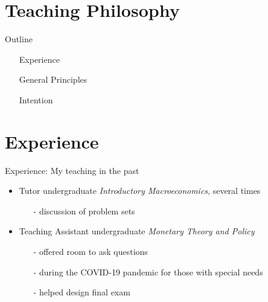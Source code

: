 

\section*{Teaching Philosophy}

\begin{frame}{Outline}
	\vspace{-15mm}\hspace{-10mm}
	\begin{minipage}{1\textwidth}
\begin{itemize}
	\item[] Experience
	\vspace{6mm}
	\item[] General Principles
	\vspace{6mm}
	\item[] Intention
\end{itemize}

\end{minipage}
\end{frame}
\section*{Experience}
\begin{frame}{Experience: My teaching in the past}
	\begin{itemize}[<+->]
		\item Tutor undergraduate \textit{Introductory  Macroeconomics}, several times
		\vspace{2mm}
		\begin{itemize}
			\item[-] discussion of problem sets
		\end{itemize}
	\vspace{3mm}
		\item Teaching Assistant undergraduate \textit{Monetary Theory and Policy} 
		\vspace{2mm}		
		\begin{itemize}
			\item[-] offered room to ask questions 
			\item[-] during the COVID-19 pandemic for those with special needs
			\item[-] helped design final exam
		\end{itemize}
	\end{itemize}
\end{frame}

